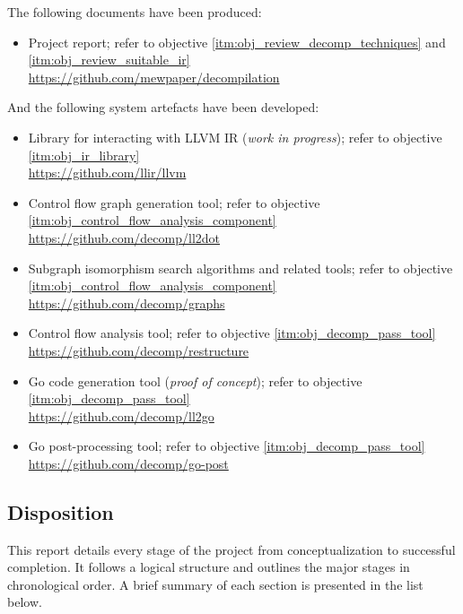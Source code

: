 The following documents have been produced:
\begin{itemize}
	\item Project report; refer to objective \ref{itm:obj_review_decomp_techniques} and \ref{itm:obj_review_suitable_ir} \\ \url{https://github.com/mewpaper/decompilation}
\end{itemize}

And the following system artefacts have been developed:
\begin{itemize}
	\item Library for interacting with LLVM IR (\textit{work in progress}); refer to objective \ref{itm:obj_ir_library} \\ \url{https://github.com/llir/llvm}
	\item Control flow graph generation tool; refer to objective \ref{itm:obj_control_flow_analysis_component} \\ \url{https://github.com/decomp/ll2dot}
	\item Subgraph isomorphism search algorithms and related tools; refer to objective \ref{itm:obj_control_flow_analysis_component} \\ \url{https://github.com/decomp/graphs}
	\item Control flow analysis tool; refer to objective \ref{itm:obj_decomp_pass_tool} \\ \url{https://github.com/decomp/restructure}
	\item Go code generation tool (\textit{proof of concept}); refer to objective \ref{itm:obj_decomp_pass_tool} \\ \url{https://github.com/decomp/ll2go}
	\item Go post-processing tool; refer to objective \ref{itm:obj_decomp_pass_tool} \\ \url{https://github.com/decomp/go-post}
\end{itemize}


\subsection{Disposition}

This report details every stage of the project from conceptualization to successful completion. It follows a logical structure and outlines the major stages in chronological order. A brief summary of each section is presented in the list below.

